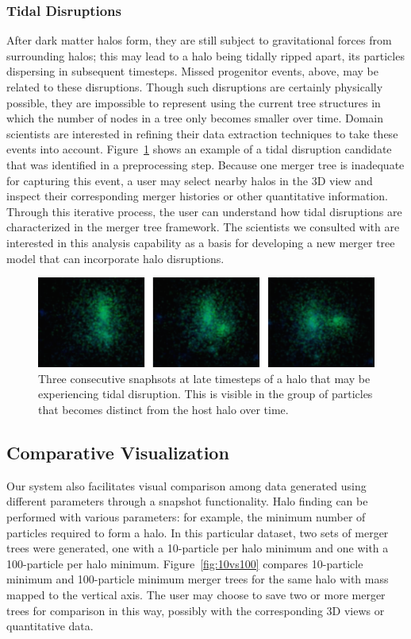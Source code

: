 \subsubsection{Tidal Disruptions}

After dark matter halos form, they are still subject to gravitational forces from surrounding halos; this may lead to a halo being tidally ripped apart, its particles dispersing in subsequent timesteps. Missed progenitor events, above, may be related to these disruptions. Though such disruptions are certainly physically possible, they are impossible to represent using the current tree structures in which the number of nodes in a tree only becomes smaller over time. Domain scientists are interested in refining their data extraction techniques to take these events into account. Figure~\ref{fig:disruption} shows an example of a tidal disruption candidate that was identified in a preprocessing step. Because one merger tree is inadequate for capturing this event, a user may select nearby halos in the 3D view and inspect their corresponding merger histories or other quantitative information. Through this iterative process, the user can understand how tidal disruptions are characterized in the merger tree framework. The scientists we consulted with are interested in this analysis capability as a basis for developing a new merger tree model that can incorporate halo disruptions.

	\begin{figure}[t]
		\includegraphics[width=\textwidth]{images/darkmatter/disruption_final.png}
		\caption{Three consecutive snaphsots at late timesteps of a halo that may be experiencing tidal disruption. This is visible in the group of particles that becomes distinct from the host halo over time.}
		\label{fig:disruption}
	\end{figure}

\subsection{Comparative Visualization}

Our system also facilitates visual comparison among data generated using different parameters through a snapshot functionality. Halo finding can be performed with various parameters: for example, the minimum number of particles required to form a halo. In this particular dataset, two sets of merger trees were generated, one with a 10-particle per halo minimum and one with a 100-particle per halo minimum. Figure~\ref{fig:10vs100} compares 10-particle minimum and 100-particle minimum merger trees for the same halo with mass mapped to the vertical axis. The user may choose to save two or more merger trees for comparison in this way, possibly with the corresponding 3D views or quantitative data.

